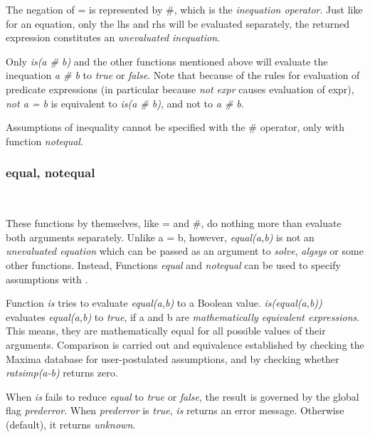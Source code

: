 \documentclass[../Maxima_Workbook.tex]{subfiles}
\begin{document}
\lz \hyt{\#}{\tcr{\emph{\#}}} \hfill {}\index{\#}

\lz The negation of = is represented by \#, which is the \emph{inequation operator}. Just like for an equation, only the lhs and rhs will be evaluated separately, the returned expression constitutes an \emph{unevaluated inequation}. 

\lz Only \emph{is(a \# b)} and the other functions mentioned above will evaluate the inequation \emph{a \# b} to \emph{true} or \emph{false}. Note that because of the rules for evaluation of predicate expressions (in particular because \emph{not expr} causes evaluation of expr), \emph{not a = b} is equivalent to \emph{is(a \# b)}, and not to \emph{a \# b}. 

\lz Assumptions of inequality cannot be specified with the \# operator, only with function \emph{notequal}.

\subsubsection{equal, notequal}

\lz {} \hfill \tcr{[function]} \\
\lz {} \hfill \tcr{[function]}

\lz These functions by themselves, like = and \#, do nothing more than evaluate both arguments separately. Unlike a = b, however, \emph{equal(a,b)} is not an \emph{unevaluated equation} which can be passed as an argument to \emph{solve}, \emph{algsys} or some other functions. Instead, Functions \emph{equal} and \emph{notequal} can be used to specify assumptions with .

\lz Function \emph{is} tries to evaluate \emph{equal(a,b)} to a Boolean value. \emph{is(equal(a,b))} evaluates \emph{equal(a,b)} to \emph{true}, if a and b are \emph{mathematically equivalent expressions}. This means, they are mathematically equal for all possible values of their arguments. Comparison is carried out and equivalence established by checking the Maxima database for user-postulated assumptions, and by checking whether \emph{ratsimp(a-b)} returns zero.

\lz When \emph{is} fails to reduce \emph{equal} to \emph{true} or \emph{false}, the result is governed by the global flag \emph{prederror}. When \emph{prederror} is \emph{true}, \emph{is} returns an error message. Otherwise (default), it returns \emph{unknown}.
\end{document}
